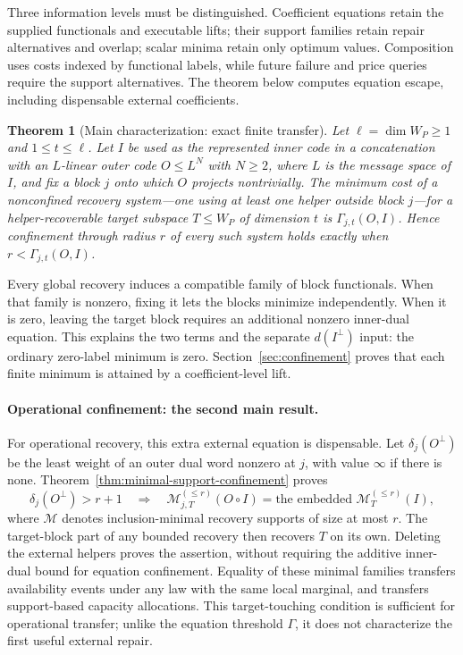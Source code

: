 \documentclass[11pt]{article}
\newtheorem{theorem}{Theorem}[section]
\theoremstyle{definition}
\begin{document}
Three information levels must be distinguished.  Coefficient equations
retain the supplied functionals and executable lifts; their support families
retain repair alternatives and overlap; scalar minima retain only optimum
values.  Composition uses costs indexed by functional labels, while future
failure and price queries require the support alternatives.  The theorem
below computes equation escape, including dispensable external coefficients.

\begin{theorem}[Main characterization: exact finite transfer]
\label{thm:main}
%
%
Let $\ell=\dim W_P\geq1$ and $1\leq t\leq\ell$.  Let $I$ be used as the
represented inner code in a concatenation with an
$L$-linear outer code $O\leq L^N$ with $N\geq2$, where $L$ is the message space of $I$,
and fix a block $j$ onto which $O$ projects nontrivially.  The minimum cost of a
nonconfined recovery system---one using at least one helper outside block
$j$---for a helper-recoverable target subspace $T\leq W_P$ of dimension $t$
is $\Gamma_{j,t}(O,I)$.  Hence confinement through radius $r$ of every such
system holds exactly when $r<\Gamma_{j,t}(O,I)$.
\end{theorem}

Every global recovery induces a compatible family of block functionals.
When that family is nonzero, fixing it lets the blocks minimize independently.
When it is zero, leaving the target block requires an additional nonzero
inner-dual equation.  This explains the two terms and the separate
$d(I^\perp)$ input: the ordinary zero-label minimum is zero.
Section~\ref{sec:confinement} proves that each finite minimum is attained by a
coefficient-level lift.

\paragraph{Operational confinement: the second main result.}
For operational recovery, this extra external equation is dispensable.
Let $\delta_j(O^\perp)$ be the least weight of an outer dual word nonzero
at $j$, with value $\infty$ if there is none.
Theorem~\ref{thm:minimal-support-confinement} proves
\[
 \delta_j(O^\perp)>r+1
 \quad\Longrightarrow\quad
 \mathcal M_{j,T}^{(\leq r)}(O\circ I)
 =\text{the embedded }\mathcal M_T^{(\leq r)}(I),
\]
where $\mathcal M$ denotes inclusion-minimal recovery supports of size at
most $r$.  The target-block part of any bounded recovery then recovers $T$
on its own.  Deleting the external helpers proves the assertion, without
requiring the additive inner-dual bound for equation confinement.  Equality
of these minimal families transfers availability events under any law with
the same local marginal, and transfers support-based capacity allocations.  This target-touching
condition is sufficient for operational transfer; unlike the equation
threshold $\Gamma$, it does not characterize the first useful external repair.
\end{document}
